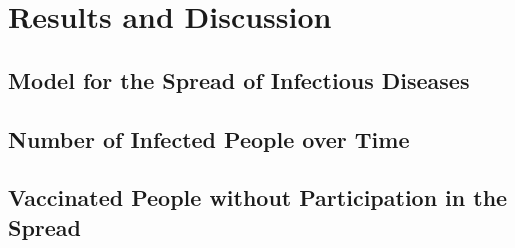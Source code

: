 \section{Results and Discussion}

\subsection{Model for the Spread of Infectious Diseases}

\subsection{Number of Infected People over Time}

\subsection{Vaccinated People without Participation in the Spread}